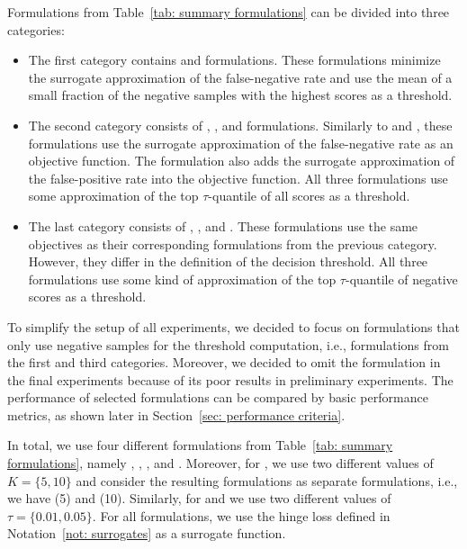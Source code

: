 Formulations from Table~\ref{tab: summary formulations} can be divided into three categories:
\begin{itemize}
  \item The first category contains \TopPush and \TopPushK formulations. These formulations minimize the surrogate approximation of the false-negative rate and use the mean of a small fraction of the negative samples with the highest scores as a threshold.
  \item The second category consists of \Grill, \TopMeanK, and \PatMat formulations. Similarly to \TopPush and \TopPushK, these formulations use the surrogate approximation of the false-negative rate as an objective function. The \Grill formulation also adds the surrogate approximation of the false-positive rate into the objective function. All three formulations use some approximation of the top $\tau$-quantile of all scores as a threshold.
  \item The last category consists of \GrillNP, \tauFPL, and \PatMatNP. These formulations use the same objectives as their corresponding formulations from the previous category. However, they differ in the definition of the decision threshold. All three formulations use some kind of approximation of the top $\tau$-quantile of negative scores as a threshold.
\end{itemize}
To simplify the setup of all experiments, we decided to focus on formulations that only use negative samples for the threshold computation, i.e., formulations from the first and third categories. Moreover, we decided to omit the \GrillNP formulation in the final experiments because of its poor results in preliminary experiments. The performance of selected formulations can be compared by basic performance metrics, as shown later in Section~\ref{sec: performance criteria}.

In total, we use four different formulations from Table~\ref{tab: summary formulations}, namely \TopPush, \TopPushK, \tauFPL, and \PatMatNP. Moreover, for \TopPushK, we use two different values of~$K = \{5, 10\}$ and consider the resulting formulations as separate formulations, i.e., we have \TopPushK(5) and \TopPushK(10). Similarly, for \tauFPL and \PatMat we use two different values of~$\tau = \{0.01, 0.05\}.$ For all formulations, we use the hinge loss defined in Notation~\ref{not: surrogates} as a surrogate function.

